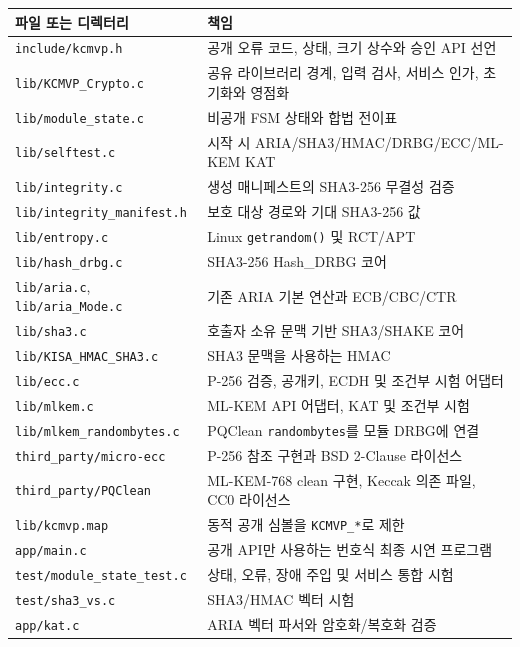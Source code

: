 \documentclass[11pt,a4paper]{article}
\begin{document}
\begin{longtable}{p{}p{}}
\toprule
파일 또는 디렉터리 & 책임 \\
\midrule
\endhead
\texttt{include/kcmvp.h} & 공개 오류 코드, 상태, 크기 상수와 승인 API 선언 \\
\texttt{lib/KCMVP\_Crypto.c} & 공유 라이브러리 경계, 입력 검사, 서비스 인가, 초기화와 영점화 \\
\texttt{lib/module\_state.c} & 비공개 FSM 상태와 합법 전이표 \\
\texttt{lib/selftest.c} & 시작 시 ARIA/SHA3/HMAC/DRBG/ECC/ML-KEM KAT \\
\texttt{lib/integrity.c} & 생성 매니페스트의 SHA3-256 무결성 검증 \\
\texttt{lib/integrity\_manifest.h} & 보호 대상 경로와 기대 SHA3-256 값 \\
\texttt{lib/entropy.c} & Linux \texttt{getrandom()} 및 RCT/APT \\
\texttt{lib/hash\_drbg.c} & SHA3-256 Hash\_DRBG 코어 \\
\texttt{lib/aria.c}, \texttt{lib/aria\_Mode.c} & 기존 ARIA 기본 연산과 ECB/CBC/CTR \\
\texttt{lib/sha3.c} & 호출자 소유 문맥 기반 SHA3/SHAKE 코어 \\
\texttt{lib/KISA\_HMAC\_SHA3.c} & SHA3 문맥을 사용하는 HMAC \\
\texttt{lib/ecc.c} & P-256 검증, 공개키, ECDH 및 조건부 시험 어댑터 \\
\texttt{lib/mlkem.c} & ML-KEM API 어댑터, KAT 및 조건부 시험 \\
\texttt{lib/mlkem\_randombytes.c} & PQClean \texttt{randombytes}를 모듈 DRBG에 연결 \\
\texttt{third\_party/micro-ecc} & P-256 참조 구현과 BSD 2-Clause 라이선스 \\
\texttt{third\_party/PQClean} & ML-KEM-768 clean 구현, Keccak 의존 파일, CC0 라이선스 \\
\texttt{lib/kcmvp.map} & 동적 공개 심볼을 \texttt{KCMVP\_*}로 제한 \\
\texttt{app/main.c} & 공개 API만 사용하는 번호식 최종 시연 프로그램 \\
\texttt{test/module\_state\_test.c} & 상태, 오류, 장애 주입 및 서비스 통합 시험 \\
\texttt{test/sha3\_vs.c} & SHA3/HMAC 벡터 시험 \\
\texttt{app/kat.c} & ARIA 벡터 파서와 암호화/복호화 검증 \\
\bottomrule
\end{longtable}
\end{document}
